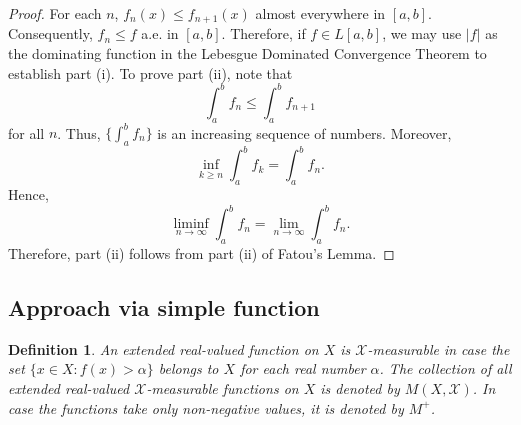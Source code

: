 \documentclass[12pt]{amsart}
\newtheorem{definition}{Definition}
\theoremstyle{plain}
\theoremstyle{definition}
\theoremstyle{remark}
\numberwithin{equation}{section}
\numberwithin{thm}{section}
\begin{document}
\begin{proof}
    For each $n$, $f_n(x) \leq f_{n+1}(x)$ almost everywhere in $[a, b]$. Consequently, $f_n \leq f$ a.e. in $[a, b]$. Therefore, if $f \in L[a, b]$, we may use $|f|$ as the dominating function in the Lebesgue Dominated Convergence Theorem to establish part (i).
To prove part (ii), note that
\[ \int_{a}^{b} f_n \leq \int_{a}^{b} f_{n+1} \]
for all $n$. Thus, $\{\int_{a}^{b} f_n\}$ is an increasing sequence of numbers. Moreover,
\[ \inf_{k \geq n} \int_{a}^{b} f_k = \int_{a}^{b} f_n. \]
Hence,
\[ \liminf_{n \to \infty} \int_{a}^{b} f_n = \lim_{n \to \infty} \int_{a}^{b} f_n. \]
Therefore, part (ii) follows from part (ii) of Fatou’s Lemma.

\end{proof}
\subsection{Approach via simple function}
\begin{definition}
    An extended real-valued function on $X$ is $\mathcal{X}$-measurable in case the set $\{ x \in X: f(x) > \alpha \}$ belongs to $X$ for each real number $\alpha$. The collection of all extended real-valued $\mathcal{X}$-measurable functions on $X$ is denoted by $M(X,\mathcal{X})$. In case the functions take only non-negative values, it is denoted by $M^+$. 
\end{definition}
\end{document}
